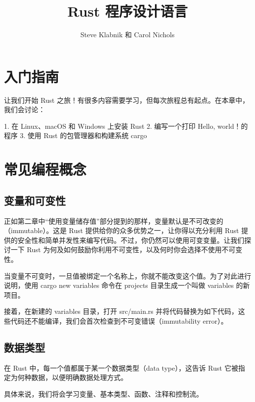 \documentclass[]{article}
\title{Rust 程序设计语言}
\author{Steve Klabnik 和 Carol Nichols}
\begin{document}
\maketitle

\section{入门指南}
	让我们开始 Rust 之旅！有很多内容需要学习，但每次旅程总有起点。在本章中，我们会讨论：
	
	1. 在 Linux、macOS 和 Windows 上安装 Rust
	2. 编写一个打印 Hello, world！的程序
	3. 使用 Rust 的包管理器和构建系统 cargo
\section{常见编程概念}
	\subsection{变量和可变性}
	正如第二章中“使用变量储存值”部分提到的那样，变量默认是不可改变的（immutable）。这是 Rust 提供给你的众多优势之一，让你得以充分利用 Rust 提供的安全性和简单并发性来编写代码。不过，你仍然可以使用可变变量。让我们探讨一下 Rust 为何及如何鼓励你利用不可变性，以及何时你会选择不使用不可变性。
	
	当变量不可变时，一旦值被绑定一个名称上，你就不能改变这个值。为了对此进行说明，使用 cargo new variables 命令在 projects 目录生成一个叫做 variables 的新项目。

	接着，在新建的 variables 目录，打开 src/main.rs 并将代码替换为如下代码，这些代码还不能编译，我们会首次检查到不可变错误（immutability error）。

	\subsection{数据类型}
	在 Rust 中，每一个值都属于某一个数据类型（data type），这告诉 Rust 它被指定为何种数据，以便明确数据处理方式。
	
具体来说，我们将会学习变量、基本类型、函数、注释和控制流。
\end{document}
